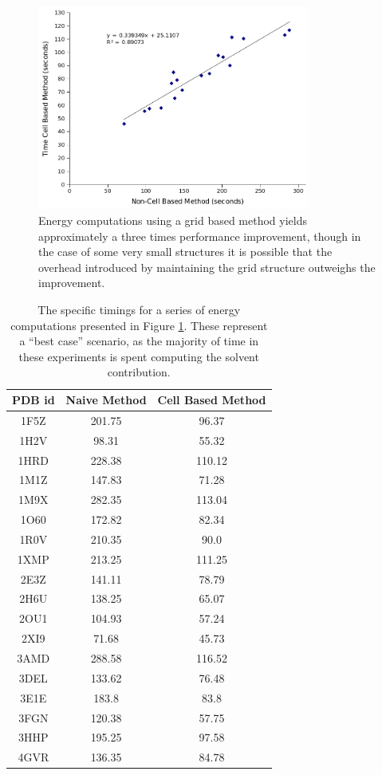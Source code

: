 \begin{figure}[H]
\begin{center}
\includegraphics[width=0.8\textwidth]{figures/energy_calculation_timings.png}
\caption{Energy computations using a grid based method yields approximately a three times performance improvement, though in the case of some very small structures it is possible that the overhead introduced by maintaining the grid structure outweighs the improvement.}
\label{fig:ddr}
\end{center}
\end{figure}

\begin{table}[H]
\centering
\label{table:energy_timings}
\begin{tabular}{|c|c|c|}
\hline
PDB id	& Naive Method	& Cell Based Method	\\
\hline
1F5Z	&  201.75	&  96.37	\\
1H2V	&  98.31	&  55.32	\\
1HRD	&  228.38	&  110.12	\\
1M1Z	&  147.83	&  71.28	\\
1M9X	&  282.35	&  113.04	\\
1O60	&  172.82	&  82.34	\\
1R0V	&  210.35	&  90.0  \\
1XMP	&  213.25	&  111.25	\\
2E3Z	&  141.11	&  78.79	\\
2H6U	&  138.25	&  65.07	\\
2OU1	&  104.93	&  57.24	\\
2XI9	&  71.68	&  45.73	\\
3AMD	&  288.58	&  116.52	\\
3DEL	&  133.62	&  76.48	\\
3E1E	&  183.8	&  83.8	\\
3FGN	&  120.38	&  57.75	\\
3HHP	&  195.25	&  97.58	\\
4GVR	&  136.35	&  84.78	\\
\hline
\end{tabular}
\caption{The specific timings for a series of energy computations presented in Figure \ref{fig:ddr}.
These represent a ``best case'' scenario, as the majority of time in these experiments is spent computing the solvent contribution.}
\end{table}



